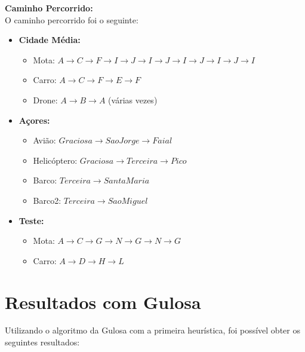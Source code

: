 \documentclass[a4paper,12pt]{scrreprt}
\begin{document}
\textbf{Caminho Percorrido:} \\
O caminho percorrido foi o seguinte:
\begin{itemize}
    \item \textbf{Cidade Média:}
        \begin{itemize}
            \item Mota: $A \rightarrow C \rightarrow F \rightarrow I \rightarrow J \rightarrow I
             \rightarrow J \rightarrow I \rightarrow J \rightarrow I \rightarrow J \rightarrow I$ \\
            \item Carro: $A \rightarrow C \rightarrow F \rightarrow E \rightarrow F$ \\
            \item Drone: $A \rightarrow B \rightarrow A$ (várias vezes)
        \end{itemize}
    \item \textbf{Açores:}
        \begin{itemize}
            \item Avião: $Graciosa \rightarrow Sao Jorge \rightarrow Faial$ \\
            \item Helicóptero: $Graciosa \rightarrow Terceira \rightarrow Pico$ \\
            \item Barco: $Terceira \rightarrow Santa Maria$ \\
            \item Barco2: $Terceira \rightarrow Sao Miguel$
        \end{itemize}
    \item \textbf{Teste:}
        \begin{itemize}
            \item Mota: $A \rightarrow C \rightarrow G \rightarrow N \rightarrow G
            \rightarrow N \rightarrow G $ \\
            \item Carro: $A \rightarrow D \rightarrow H \rightarrow L$
        \end{itemize}
\end{itemize}

\clearpage

\section{Resultados com Gulosa}

Utilizando o algoritmo da Gulosa com a primeira heurística, foi possível obter os seguintes resultados:
\end{document}
